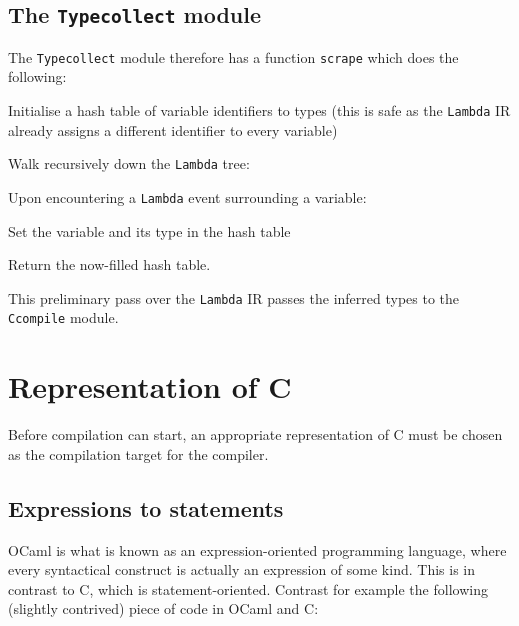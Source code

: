\subsection{The \texttt{Typecollect} module}

The \texttt{Typecollect} module therefore has a function \texttt{scrape} which
does the following:

\begin{enumerate}

    \item Initialise a hash table of variable identifiers to types
    (this is safe as the \texttt{Lambda} IR already assigns a different 
    identifier to every variable)

    \item Walk recursively down the \texttt{Lambda} tree:

    {\setlength{\itemindent}{25pt} \item Upon encountering a \texttt{Lambda} 
    event surrounding a variable:}

    {\setlength{\itemindent}{50pt} \item Set the variable and its type in the 
    hash table}

    \item Return the now-filled hash table.

\end{enumerate}

This preliminary pass over the \texttt{Lambda} IR passes the inferred types to
the \texttt{Ccompile} module.

\section{Representation of C}\label{representation-c}

Before compilation can start, an appropriate representation of C must be chosen 
as the compilation target for the compiler.

\subsection{Expressions to statements}\label{expr-stmt}

OCaml is what is known as an expression-oriented programming language, where
every syntactical construct is actually an expression of some kind. This is in
contrast to C, which is statement-oriented. Contrast for example the following
(slightly contrived) piece of code in OCaml and C:

